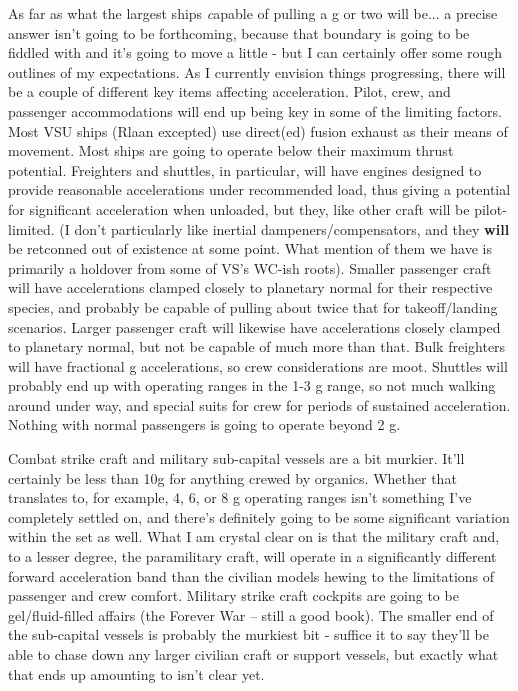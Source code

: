 As far as what the largest ships {\emph capable} of pulling a g or two
will be... a precise answer isn't going to be forthcoming, because
that boundary is going to be fiddled with and it's going to move a
little - but I can certainly offer some rough outlines of my
expectations. As I currently envision things progressing, there will
be a couple of different key items affecting acceleration. Pilot,
crew, and passenger accommodations will end up being key in some of
the limiting factors. Most VSU ships (Rlaan excepted) use direct(ed)
fusion exhaust as their means of movement. Most ships are going to
operate below their maximum thrust potential. Freighters and shuttles,
in particular, will have engines designed to provide reasonable
accelerations under recommended load, thus giving a potential for
significant acceleration when unloaded, but they, like other craft
will be pilot-limited. (I don't particularly like inertial
dampeners/compensators, and they {\bf will} be retconned out of
existence at some point. What mention of them we have is primarily a
holdover from some of VS's WC-ish roots). Smaller passenger craft will
have accelerations clamped closely to planetary normal for their
respective species, and probably be capable of pulling about twice
that for takeoff/landing scenarios. Larger passenger craft will
likewise have accelerations closely clamped to planetary normal, but
not be capable of much more than that. Bulk freighters will have
fractional g accelerations, so crew considerations are moot. Shuttles
will probably end up with operating ranges in the 1-3 g range, so not
much walking around under way, and special suits for crew for periods
of sustained acceleration. Nothing with normal passengers is going to
operate beyond 2 g.

Combat strike craft and military sub-capital vessels are a bit
murkier. It'll certainly be less than 10g for anything crewed by
organics. Whether that translates to, for example, 4, 6, or 8 g
operating ranges isn't something I've completely settled on, and
there's definitely going to be some significant variation within the
set as well. What I am crystal clear on is that the military craft
and, to a lesser degree, the paramilitary craft, will operate in a
significantly different forward acceleration band than the civilian
models hewing to the limitations of passenger and crew
comfort. Military strike craft cockpits are going to be
gel/fluid-filled affairs (the Forever War -- still a good book). The
smaller end of the sub-capital vessels is probably the murkiest bit -
suffice it to say they'll be able to chase down any larger civilian
craft or support vessels, but exactly what that ends up amounting to
isn't clear yet.

